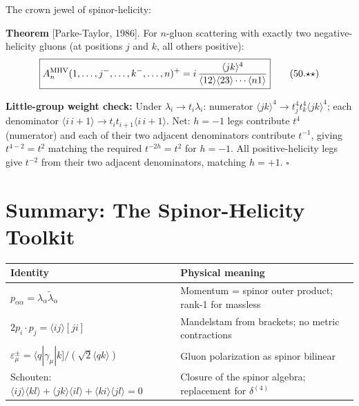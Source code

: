\documentclass[12pt]{article}
\begin{document}
The crown jewel of spinor-helicity:

\begin{mdframed}[backgroundcolor=red!5]
\textbf{Theorem} [Parke-Taylor, 1986].
For $n$-gluon scattering with exactly two negative-helicity gluons
(at positions $j$ and $k$, all others positive):
\begin{equation}
\boxed{%
A_n^{\rm MHV}(1,\ldots,j^-,\ldots,k^-,\ldots,n)^+
= i\,\frac{\langle jk\rangle^4}
{\langle12\rangle\langle23\rangle\cdots\langle n1\rangle}
}
\tag{50.$\star\star$}
\end{equation}
\end{mdframed}

\textbf{Little-group weight check:} Under $\lambda_i\to t_i\lambda_i$:
numerator $\langle jk\rangle^4\to t_j^4t_k^4\langle jk\rangle^4$;
each denominator $\langle i\,i+1\rangle\to t_i t_{i+1}\langle i\,i+1\rangle$.
Net: $h=-1$ legs contribute $t^4$ (numerator) and each of their two
adjacent denominators contribute $t^{-1}$, giving $t^{4-2}=t^2$ matching
the required $t^{-2h}=t^2$ for $h=-1$.  All positive-helicity legs
give $t^{-2}$ from their two adjacent denominators, matching $h=+1$.  $\square$

\section{Summary: The Spinor-Helicity Toolkit}

\begin{center}
\begin{tabular}{|p{}|p{}|}
\hline
\textbf{Identity} & \textbf{Physical meaning} \\
\hline
$p_{\alpha\dot\alpha}=\lambda_\alpha\tilde\lambda_{\dot\alpha}$ &
Momentum = spinor outer product; rank-1 for massless \\
\hline
$2p_i\cdot p_j=\langle ij\rangle[ji]$ &
Mandelstam from brackets; no metric contractions \\
\hline
$\varepsilon^\pm_\mu=\langle q|\gamma_\mu|k]/(\sqrt2\langle qk\rangle)$ &
Gluon polarization as spinor bilinear \\
\hline
Schouten: $\langle ij\rangle\langle kl\rangle+\langle jk\rangle\langle il\rangle+\langle ki\rangle\langle jl\rangle=0$ &
Closure of the spinor algebra; replacement for $\delta^{(4)}$ \\
\hline
\end{tabular}
\end{center}

\vfill
\end{document}
